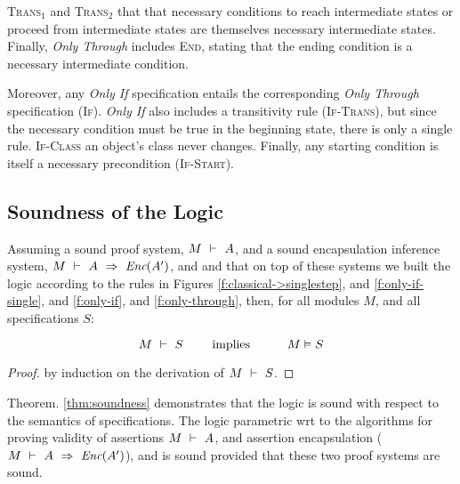 \textsc{Trans}$_1$ and \textsc{Trans}$_2$ 
that  that necessary conditions to reach intermediate states or 
proceed from intermediate states are themselves necessary intermediate states. 
Finally, \emph{Only Through} includes \textsc{End}, stating that the ending condition is 
a necessary intermediate condition.

Moreover, any \emph{Only If} specification entails the corresponding
 \emph{Only Through} specification (\textsc{If}).
\emph{Only If} also includes a transitivity rule (\textsc{If-Trans}), but 
since the necessary condition must be true in the beginning state,
there is only a single rule. \textsc{If-Class} 
an object's class never changes.
Finally, any starting condition is
itself a necessary precondition (\textsc{If-Start}). 



\subsection{Soundness of the \Nec Logic}

\label{s:soundness}

\begin{theorem}[Soundness]
\label{thm:soundness}
Assuming a sound \SpecO proof system, $M\ \vdash\ A$, and
a sound encapsulation inference system, $M\ \vdash\ A\ \Rightarrow\ \textit{Enc}(A')$,
 and  and that on top of these systems we built
 the \Nec logic according to the rules in Figures \ref{f:classical->singlestep},  and \ref{f:only-if-single}, and \ref{f:only-if},  and \ref{f:only-through},   then, for    all modules $M$, and all \Nec specifications  $S$:
 
 $$\proves{M}{S}\ \ \ \ \ \ \ \mbox{implies}\ \ \ \ \ \  \ \ \ \satisfies{M}{S}$$
\end{theorem}

\begin{proof}
by induction on the derivation of $M\ \vdash\ S$.
\end{proof}

Theorem. \ref{thm:soundness} demonstrates 
 that the   \Nec logic is sound with respect to the semantics of \Nec specifications.
 The \Nec logic parametric wrt to the algorithms for proving validity of assertions
 $M\ \vdash\ A$, and 
 assertion encapsulation ($M\ \vdash\ A\ \Rightarrow\ \textit{Enc}(A')$), and is sound
 provided that these two proof systems are sound.


